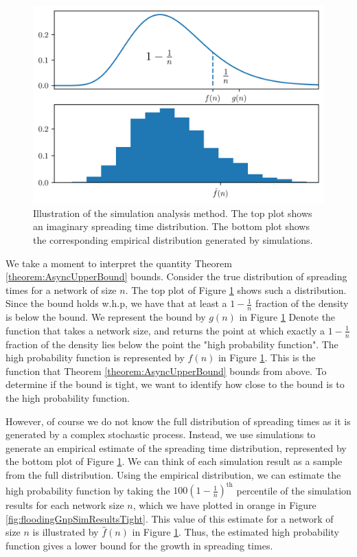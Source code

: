 \begin{figure}[h]
	\centering
	\includegraphics[width=1\textwidth]{./figures/analysis_method_example.png}
	\caption{Illustration of the simulation analysis method. The top plot shows an imaginary spreading time distribution. The bottom plot shows the corresponding empirical distribution generated by simulations.}
	\label{fig:analysisMethod}
\end{figure}


We take a moment to interpret the quantity Theorem \ref{theorem:AsyncUpperBound} bounds. Consider the true distribution of spreading times for a network of size $n$. The top plot of Figure \ref{fig:analysisMethod} shows such a distribution. Since the bound holds w.h.p, we have that at least a $1-\frac{1}{n}$ fraction of the density is below the bound. We represent the bound by $g(n)$ in Figure \ref{fig:analysisMethod} Denote the function that takes a network size, and returns the point at which exactly a $1-\frac{1}{n}$ fraction of the density lies below the point the "high probability function". The high probability function is represented by $f(n)$ in Figure \ref{fig:analysisMethod}. This is the function that Theorem \ref{theorem:AsyncUpperBound} bounds from above. To determine if the bound is tight, we want to identify how close to the bound is to the high probability function.


However, of course we do not know the full distribution of spreading times as it is generated by a complex stochastic process. Instead, we use simulations to generate an empirical estimate of the spreading time distribution, represented by the bottom plot of Figure \ref{fig:analysisMethod}. We can think of each simulation result as a sample from the full distribution. Using the empirical distribution, we can estimate the high probability function by taking the $100(1-\frac{1}{n})^\text{th}$ percentile of the simulation results for each network size $n$, which we have plotted in orange in Figure \ref{fig:floodingGnpSimResultsTight}. This value of this estimate for a network of size $n$ is illustrated by $\hat{f}(n)$ in Figure \ref{fig:analysisMethod}. Thus, the estimated high probability function gives a lower bound for the growth in spreading times. 

